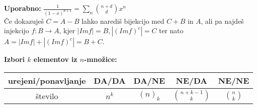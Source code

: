 \documentclass[a4paper, oneside, 12pt]{article}
\theoremstyle{definition}
\begin{document}
\textbf{Uporabno:} $\frac{1}{(1-x)^{d+1}} = \sum_n \binom{n+d}{d} x^n$\\
Če dokazuješ $C = A - B$ lahko narediš bijekcijo med $C+B$ in $A$, ali pa najdeš
injekcijo $f \colon B \to A$, kjer $|Im f| = B, |(Im f)^c| = C$ ter nato $A = |Im f| + |(Im f)^c| = B + C$.







\textbf{Izbori $k$ elementov iz $n$-množice:} \\[6pt]
\begin{tabular}[h]{|c|c|c|c|c|}
  \hline
  urejeni/ponavljanje & DA/DA & DA/NE & NE/DA & NE/NE \\ \hline
  število & $n^k$ & $(n)_k$ & $\binom{n+k-1}{k}$ & $\binom{n}{k}$ \\ \hline
\end{tabular}



\end{document}
